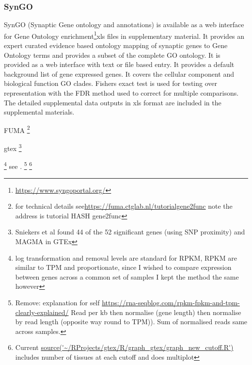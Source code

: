  \subsubsection{SynGO} SynGO (Synaptic Gene ontology and annotations) is available as a web interface for Gene Ontology enrichment\footnote{\url{https://www.syngoportal.org/}}xls files in supplementary material\cite{koopmans2019syngo}. It provides an expert curated evidence based ontology mapping of synaptic genes to Gene Ontology terms and provides a subset of the complete GO ontology. It is provided as a web interface with text or file based entry. It provides a default background list of gene expressed genes. It covers the cellular component and biological function GO clades. Fishers exact test is used for testing over representation with the FDR method\cite{benjamini1995controlling} used to correct for multiple comparisons. The detailed supplemental data outputs in xls format are included in the supplemental materials. 
 
 FUMA
 \footnote{for technical details see\url{https://fuma.ctglab.nl/tutorialgene2func} note the address is tutorial HASH gene2func}
 
 gtex
 \footnote{Sniekers et al found 44 of the 52 significant genes (using SNP proximity) and MAGMA in GTEx}
 
  \footnote{log transformation and removal levels are standard for RPKM, RPKM are similar to TPM and proportionate, since I wished to compare expression between genes across a common set of samples I kept the method the same however} see \cite{zhao2017gene}. \footnote{Remove: explanation for self \url{https://rna-seqblog.com/rpkm-fpkm-and-tpm-clearly-explained/} Read per kb then normalise (gene length) then normalise by read length (opposite way round to TPM)). Sum of normalised reads same across samples. } \footnote{Current \url{source('~/RProjects/gtex/R/graph_gtex/graph_new_cutoff.R')} includes number of tissues at each cutoff and does multiplot}
  
